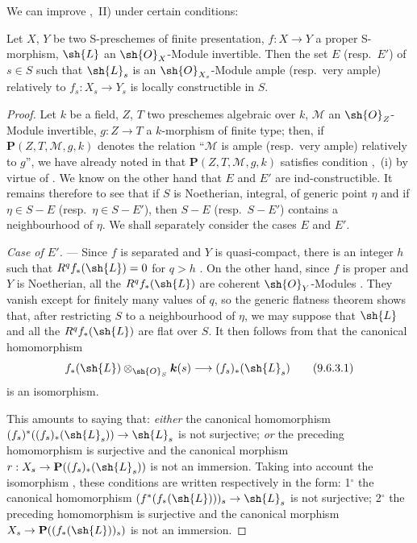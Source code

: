 We can improve ,~II) under certain conditions:

\begin{proposition}[9.6.3]
\label{IV.9.6.3}
Let $X$, $Y$ be two S-preschemes of finite presentation, $f:X\to Y$ a proper S-morphism, $\sh{L}$ an $\sh{O}_X$-Module invertible.
Then the set $E$ (resp.\ $E'$) of $s\in S$ such that $\sh{L}_s$ is an $\sh{O}_{X_s}$-Module ample (resp.\ very ample) relatively to $f_s:X_s\to Y_s$ is locally constructible in $S$.
\end{proposition}

\begin{proof}
Let $k$ be a field, $Z$, $T$ two preschemes algebraic over $k$, $\mathscr{M}$ an $\sh{O}_Z$-Module invertible, $g:Z\to T$ a $k$-morphism of finite type; then, if $\mathbf{P}(Z,T,\mathscr{M},g,k)$ denotes the relation ``$\mathscr{M}$ is ample (resp.\ very ample) relatively to $g$'', we have already noted in  that $\mathbf{P}(Z,T,\mathscr{M},g,k)$ satisfies condition ,~(i) by virtue of .
We know on the other hand that $E$ and $E'$ are ind-constructible.
It remains therefore to see that if $S$ is Noetherian, integral, of generic point $\eta$ and if $\eta\in S-E$ (resp.\ $\eta\in S-E'$), then $S-E$ (resp.\ $S-E'$) contains a neighbourhood of $\eta$.
We shall separately consider the cases $E$ and $E'$.


\emph{Case of $E'$.} ---
Since $f$ is separated and $Y$ is quasi-compact, there is an integer $h$ such that
$R^qf_*(\sh{L})=0$ for $q>h$ .
On the other hand, since $f$ is proper and $Y$ is Noetherian, all the
$R^qf_*(\sh{L})$ are coherent $\sh{O}_Y$-Modules .
They vanish except for finitely many values of $q$, so the generic flatness theorem
 shows that, after restricting $S$ to a neighbourhood of $\eta$, we may
suppose that $\sh{L}$ and all the $R^qf_*(\sh{L})$ are flat over $S$.
It then follows from  that the canonical homomorphism
\begin{equation}
\label{IV.9.6.3.1}
 f_*(\sh{L})\otimes_{\sh{O}_S}\boldsymbol{k}(s)
 \longrightarrow (f_s)_*(\sh{L}_s)
 \tag{9.6.3.1}
\end{equation}
is an isomorphism.

This amounts to saying that: \emph{either} the canonical homomorphism $(f_s)^*((f_s)_*(\sh{L}_s))\to\sh{L}_s$ is not surjective; \emph{or} the preceding homomorphism is surjective and the canonical morphism $r:X_s\to\mathbf{P}((f_s)_*(\sh{L}_s))$ is not an immersion.
Taking into account the isomorphism , these conditions are written respectively in the form: 1$^\circ$ the canonical homomorphism $(f^*(f_*(\sh{L})))_s\to\sh{L}_s$ is not surjective; 2$^\circ$ the preceding homomorphism is surjective and the canonical morphism $X_s\to\mathbf{P}((f_*(\sh{L}))_s)$ is not an immersion.


\end{proof}
